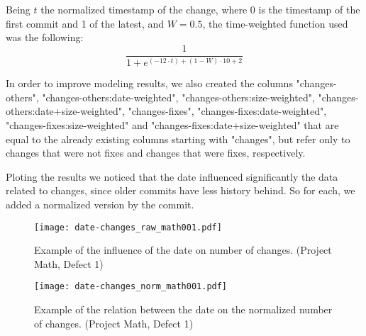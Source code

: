 Being $t$ the normalized timestamp of the change, where 0 is the timestamp of the first commit and 1 of the latest, and $W = 0.5$, the time-weighted function used was the following:
%
\begin{equation}
  \frac {1} {1 + e^{(-12 \cdot t) + (1 - W) \cdot 10 + 2}}
\end{equation}

In order to improve modeling results, we also created the columns "changes-others", "changes-others:date-weighted", "changes-others:size-weighted", "changes-others:date+size-weighted", 
"changes-fixes", "changes-fixes:date-weighted", "changes-fixes:size-weighted" and "changes-fixes:date+size-weighted" that are equal to the already existing columns starting with
"changes", but refer only to changes that were not fixes and changes that were fixes, respectively.

Ploting the results we noticed that the date influenced significantly the data related to changes, since older commits have less history behind. 
So for each, we added a normalized version by the commit.

\begin{figure}[ht]
  \begin{center}
    \leavevmode
    \texttt{[image: date-changes\_raw\_math001.pdf]}
    \caption{Example of the influence of the date on number of changes. (Project Math, Defect 1)}
    \label{fig:date-changes.raw}
  \end{center}
\end{figure}

\begin{figure}[ht]
  \begin{center}
    \leavevmode
    \texttt{[image: date-changes\_norm\_math001.pdf]}
    \caption{Example of the relation between the date on the normalized number of changes. (Project Math, Defect 1)}
    \label{fig:date-changes.norm}
  \end{center}
\end{figure}

